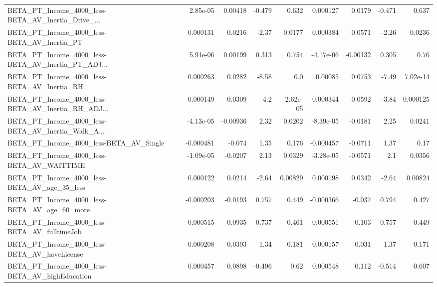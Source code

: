 \begin{tabular}{lrrrrrrrr}
BETA\_PT\_Income\_4000\_less-BETA\_AV\_Inertia\_Drive\_... &    2.85e-05 &      0.00418 &   -0.479 &    0.632 &   0.000127 &      0.0179 &       -0.471 &         0.637 \\
BETA\_PT\_Income\_4000\_less-BETA\_AV\_Inertia\_PT        &    0.000131 &       0.0216 &    -2.37 &   0.0177 &   0.000384 &      0.0571 &        -2.26 &        0.0236 \\
BETA\_PT\_Income\_4000\_less-BETA\_AV\_Inertia\_PT\_ADJ... &    5.91e-06 &      0.00199 &    0.313 &    0.754 &  -4.17e-06 &    -0.00132 &        0.305 &          0.76 \\
BETA\_PT\_Income\_4000\_less-BETA\_AV\_Inertia\_RH        &    0.000263 &       0.0282 &    -8.58 &      0.0 &    0.00085 &      0.0753 &        -7.49 &      7.02e-14 \\
BETA\_PT\_Income\_4000\_less-BETA\_AV\_Inertia\_RH\_ADJ... &    0.000149 &       0.0309 &     -4.2 & 2.62e-05 &   0.000344 &      0.0592 &        -3.84 &      0.000125 \\
BETA\_PT\_Income\_4000\_less-BETA\_AV\_Inertia\_Walk\_A... &   -4.13e-05 &     -0.00936 &     2.32 &   0.0202 &  -8.39e-05 &     -0.0181 &         2.25 &        0.0241 \\
BETA\_PT\_Income\_4000\_less-BETA\_AV\_Single            &   -0.000481 &       -0.074 &     1.35 &    0.176 &  -0.000457 &     -0.0711 &         1.37 &          0.17 \\
BETA\_PT\_Income\_4000\_less-BETA\_AV\_WAITTIME          &   -1.09e-05 &      -0.0207 &     2.13 &   0.0329 &  -3.28e-05 &     -0.0571 &          2.1 &        0.0356 \\
BETA\_PT\_Income\_4000\_less-BETA\_AV\_age\_35\_less       &    0.000122 &       0.0214 &    -2.64 &  0.00829 &   0.000198 &      0.0342 &        -2.64 &       0.00824 \\
BETA\_PT\_Income\_4000\_less-BETA\_AV\_age\_60\_more       &   -0.000203 &      -0.0193 &    0.757 &    0.449 &  -0.000366 &      -0.037 &        0.794 &         0.427 \\
BETA\_PT\_Income\_4000\_less-BETA\_AV\_fulltimeJob       &    0.000515 &       0.0935 &   -0.737 &    0.461 &   0.000551 &       0.103 &       -0.757 &         0.449 \\
BETA\_PT\_Income\_4000\_less-BETA\_AV\_haveLicense       &    0.000208 &       0.0393 &     1.34 &    0.181 &   0.000157 &       0.031 &         1.37 &         0.171 \\
BETA\_PT\_Income\_4000\_less-BETA\_AV\_highEducation     &    0.000457 &       0.0898 &   -0.496 &     0.62 &   0.000548 &       0.112 &       -0.514 &         0.607 \\

\end{tabular}
